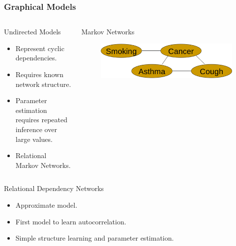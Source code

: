 \documentclass[10pt, blue,subsection=true, compress]{beamer}
\begin{document}
\begin{frame}\frametitle{Graphical Models}
\begin{columns}[t]
\begin{flushleft}
\begin{block}{Undirected Models}
\begin{itemize}
\item Represent cyclic dependencies. 
\item Requires known network structure.
 \item Parameter estimation requires repeated inference over large values.
 \item Relational Markov Networks.
\end{itemize}
\end{block}
\end{flushleft}
\begin{block}{Markov Networks}
\begin{figure}[htbp]
\centering
\includegraphics[scale=0.2]{img/rmn.eps}
\end{figure}
\end{block}
\end{columns}
\begin{center}
\begin{block}{{\color{red} Relational Dependency Networks}}
\begin{itemize}
\item Approximate model.
\item First model to learn autocorrelation. 
\item Simple structure learning and parameter estimation.
\end{itemize}
\end{block}
\end{center}
\end{frame}
\end{document}
